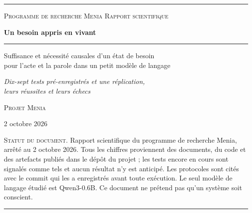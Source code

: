 \documentclass[11pt,a4paper]{article}
\begin{document}
\begin{titlepage}
\raggedright
\vspace*{0.6cm}
{\color{accent}\rule{\textwidth}{0.8pt}}\par
\vspace{0.25cm}
{\small\scshape\color{accent}Programme de recherche Menia \hfill Rapport scientifique\par}
\vspace{4.2cm}
{\sffamily\bfseries\fontsize{28}{34}\selectfont Un besoin appris en vivant\par}
\vspace{0.55cm}
{\color{accent}\rule{3.2cm}{1.6pt}}\par
\vspace{0.55cm}
{\Large Suffisance et nécessité causales d'un état de besoin\\[2pt]
pour l'acte et la parole dans un petit modèle de langage\par}
\vspace{0.7cm}
{\large\itshape Dix-sept tests pré-enregistrés et une réplication,\\ leurs réussites et leurs échecs\par}
\vfill
{\large\scshape Projet Menia\par}
\vspace{0.15cm}
{\normalsize 2 octobre 2026\par}
\vspace{1.4cm}
\begin{minipage}{0.82\textwidth}
\footnotesize\color{black!62}
\textsc{Statut du document.} Rapport scientifique du programme de recherche Menia,
arrêté au 2 octobre 2026. Tous les chiffres proviennent des documents, du code et
des artefacts publiés dans le dépôt du projet ; les tests encore en cours sont signalés
comme tels et aucun résultat n'y est anticipé. Les protocoles sont cités avec le commit
qui les a enregistrés avant toute exécution. Le seul modèle de langage étudié est
Qwen3-0.6B. Ce document ne prétend pas qu'un système soit conscient.
\end{minipage}\par
\vspace{0.5cm}
{\color{accent}\rule{\textwidth}{0.8pt}}\par
\vspace*{0.3cm}
\end{titlepage}
\end{document}
